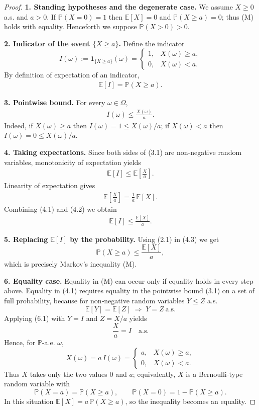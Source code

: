 \begin{proof}
\textbf{1. Standing hypotheses and the degenerate case.}  
We assume \(X\ge 0\) a.s. and \(a>0\).  If \(\mathbb{P}(X=0)=1\) then
\(\mathbb{E}[X]=0\) and \(\mathbb{P}(X\ge a)=0\); thus (M) holds with equality.
Henceforth we suppose \(\mathbb{P}(X>0)>0\).

\textbf{2. Indicator of the event \(\{X\ge a\}\).}  
Define the indicator
\[
I(\omega):=\mathbf 1_{\{X\ge a\}}(\omega)=
\begin{cases}
1, & X(\omega)\ge a,\\[2pt]
0, & X(\omega)< a .
\end{cases}
\]
By definition of expectation of an indicator,
\begin{align}
\mathbb{E}[I]=\mathbb{P}(X\ge a).\tag{2.1}
\end{align}

\textbf{3. Pointwise bound.}  
For every \(\omega\in\Omega\),
\begin{align}
I(\omega)\le\frac{X(\omega)}{a}.\tag{3.1}
\end{align}
Indeed, if \(X(\omega)\ge a\) then \(I(\omega)=1\le X(\omega)/a\); if
\(X(\omega)<a\) then \(I(\omega)=0\le X(\omega)/a\).

\textbf{4. Taking expectations.}  
Since both sides of (3.1) are non‑negative random variables, monotonicity of
expectation yields
\begin{align}
\mathbb{E}[I]\le\mathbb{E}\!\left[\frac{X}{a}\right].\tag{4.1}
\end{align}
Linearity of expectation gives
\begin{align}
\mathbb{E}\!\left[\frac{X}{a}\right]=\frac{1}{a}\,\mathbb{E}[X].\tag{4.2}
\end{align}
Combining (4.1) and (4.2) we obtain
\begin{align}
\mathbb{E}[I]\le\frac{\mathbb{E}[X]}{a}.\tag{4.3}
\end{align}

\textbf{5. Replacing \(\mathbb{E}[I]\) by the probability.}  
Using (2.1) in (4.3) we get
\[
\mathbb{P}(X\ge a)\le\frac{\mathbb{E}[X]}{a},
\]
which is precisely Markov’s inequality (M).

\textbf{6. Equality case.}  
Equality in (M) can occur only if equality holds in every step above.
Equality in (4.1) requires equality in the pointwise bound (3.1) on a set of
full probability, because for non‑negative random variables \(Y\le Z\) a.s.
\[
\mathbb{E}[Y]=\mathbb{E}[Z]\;\Longrightarrow\;Y=Z\ \text{a.s.}
\tag{6.1}
\]
Applying (6.1) with \(Y=I\) and \(Z=X/a\) yields
\[
\frac{X}{a}=I\quad\text{a.s.}
\]
Hence, for \(\mathbb{P}\)-a.e. \(\omega\),
\[
X(\omega)=a\,I(\omega)=
\begin{cases}
a, & X(\omega)\ge a,\\[2pt]
0, & X(\omega)< a .
\end{cases}
\]
Thus \(X\) takes only the two values \(0\) and \(a\); equivalently,
\(X\) is a Bernoulli‑type random variable with
\[
\mathbb{P}(X=a)=\mathbb{P}(X\ge a),\qquad
\mathbb{P}(X=0)=1-\mathbb{P}(X\ge a).
\]
In this situation \(\mathbb{E}[X]=a\,\mathbb{P}(X\ge a)\), so the inequality
becomes an equality.


\end{proof}

